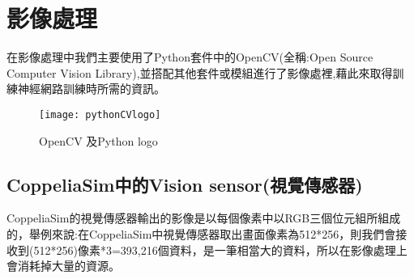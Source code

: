 \section{影像處理}

\qquad 在影像處理中我們主要使用了Python套件中的OpenCV(全稱:Open Source Computer Vision Library),並搭配其他套件或模組進行了影像處裡,藉此來取得訓練神經網路訓練時所需的資訊。\\
\begin{figure}[hbt!]
\center
\texttt{[image: pythonCVlogo]}
\caption{\Large OpenCV 及Python logo}
\end{figure}

\subsection{CoppeliaSim中的Vision sensor(視覺傳感器)}
 CoppeliaSim的視覺傳感器輸出的影像是以每個像素中以RGB三個位元組所組成的，舉例來說:在CoppeliaSim中視覺傳感器取出畫面像素為512*256，則我們會接收到(512*256)像素*3=393,216個資料，是一筆相當大的資料，所以在影像處理上會消耗掉大量的資源。\\

